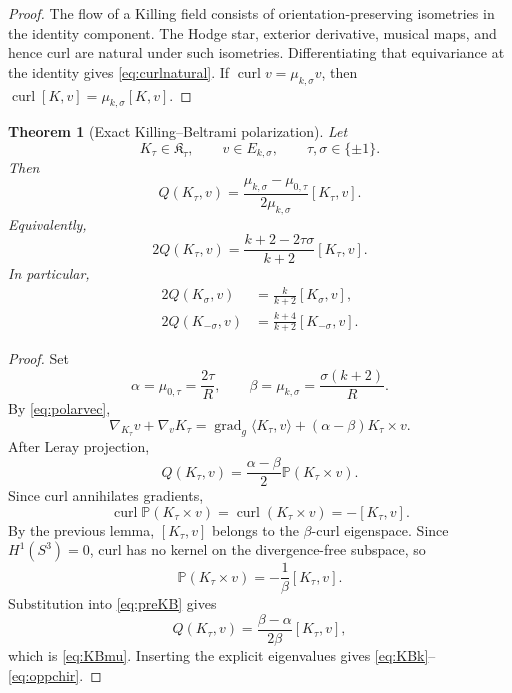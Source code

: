 \documentclass[
 aps,
 prd,
 reprint,
 amsmath,
 amssymb,
 nofootinbib,
 superscriptaddress
]{revtex4-2}
\newtheorem{theorem}{Theorem}[section]
\theoremstyle{definition}
\theoremstyle{remark}
\newcommand{\PP}{\mathbb P}
\newcommand{\cK}{\mathfrak K}
\newcommand{\curl}{\operatorname{curl}}
\newcommand{\gradg}{\operatorname{grad}_g}
\begin{document}
\begin{proof}
The flow of a Killing field consists of orientation-preserving isometries
in the identity component.  The Hodge star, exterior derivative, musical
maps, and hence curl are natural under such isometries.  Differentiating
that equivariance at the identity gives \eqref{eq:curlnatural}.  If
$\curl v=\mu_{k,\sigma}v$, then
$\curl[K,v]=\mu_{k,\sigma}[K,v]$.
\end{proof}

\begin{theorem}[Exact Killing--Beltrami polarization]
\label{thm:KBidentity}
Let
\[
 K_\tau\in\cK_\tau,\qquad
 v\in E_{k,\sigma},\qquad
 \tau,\sigma\in\{\pm1\}.
\]
Then
\begin{equation}
 \boxed{
 Q(K_\tau,v)=
 \frac{\mu_{k,\sigma}-\mu_{0,\tau}}
      {2\mu_{k,\sigma}}
 [K_\tau,v].
 }
 \label{eq:KBmu}
\end{equation}
Equivalently,
\begin{equation}
 \boxed{
 2Q(K_\tau,v)
 =
 \frac{k+2-2\tau\sigma}{k+2}[K_\tau,v].
 }
 \label{eq:KBk}
\end{equation}
In particular,
\begin{align}
 2Q(K_\sigma,v)&=\frac{k}{k+2}[K_\sigma,v],
 \label{eq:samechir}\\
 2Q(K_{-\sigma},v)&=\frac{k+4}{k+2}[K_{-\sigma},v].
 \label{eq:oppchir}
\end{align}
\end{theorem}

\begin{proof}
Set
\[
 \alpha=\mu_{0,\tau}=\frac{2\tau}{R},
 \qquad
 \beta=\mu_{k,\sigma}=\frac{\sigma(k+2)}{R}.
\]
By \eqref{eq:polarvec},
\[
 \nabla_{K_\tau}v+\nabla_vK_\tau
 =
 \gradg\langle K_\tau,v\rangle
 +(\alpha-\beta)K_\tau\times v.
\]
After Leray projection,
\begin{equation}
 Q(K_\tau,v)=\frac{\alpha-\beta}{2}
 \PP(K_\tau\times v).
 \label{eq:preKB}
\end{equation}
Since curl annihilates gradients,
\[
 \curl\PP(K_\tau\times v)
 =
 \curl(K_\tau\times v)
 =
 -[K_\tau,v].
\]
By the previous lemma,
$[K_\tau,v]$ belongs to the $\beta$-curl eigenspace.
Since $H^1(S^3)=0$, curl has no kernel on the divergence-free subspace, so
\[
 \PP(K_\tau\times v)
 =
 -\frac1\beta[K_\tau,v].
\]
Substitution into \eqref{eq:preKB} gives
\[
 Q(K_\tau,v)=\frac{\beta-\alpha}{2\beta}[K_\tau,v],
\]
which is \eqref{eq:KBmu}.  Inserting the explicit eigenvalues gives
\eqref{eq:KBk}--\eqref{eq:oppchir}.
\end{proof}
\end{document}
